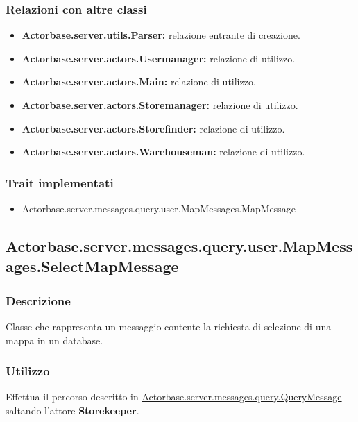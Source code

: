 \documentclass[a4paper]{article}
\begin{document}
			\subsubsection{Relazioni con altre classi}
				\begin{itemize}
					\item \textbf{Actorbase.server.utils.Parser:} relazione entrante di creazione.
					\item \textbf{Actorbase.server.actors.Usermanager:} relazione di utilizzo.
					\item \textbf{Actorbase.server.actors.Main:} relazione di utilizzo.
					\item \textbf{Actorbase.server.actors.Storemanager:} relazione di utilizzo.
					\item \textbf{Actorbase.server.actors.Storefinder:} relazione di utilizzo.
					\item \textbf{Actorbase.server.actors.Warehouseman:} relazione di utilizzo.
				\end{itemize}
			\subsubsection{Trait implementati}
				\begin{itemize}
					\item Actorbase.server.messages.query.user.MapMessages.MapMessage
				\end{itemize}
				
		\subsection{Actorbase.server.messages.query.user.MapMessages.SelectMapMessage}
			\subsubsection{Descrizione}
				Classe che rappresenta un messaggio contente la richiesta di selezione di una mappa in un database.
				
			\subsubsection{Utilizzo}
				Effettua il percorso descritto in \hyperref[QueryMessage]{Actorbase.server.messages.query.QueryMessage} saltando l'attore \textbf{Storekeeper}.
				
\end{document}
